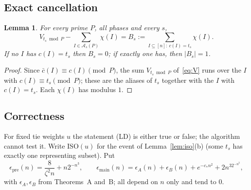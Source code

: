 \documentclass[11pt]{article}
\newtheorem{lemma}{Lemma}[section]
\theoremstyle{definition}
\newcommand{\bc}{\bar c}
\newcommand{\abs}[1]{\lvert #1\rvert}
\newcommand{\cA}{\mathcal A}
\begin{document}
\subsection{Exact cancellation}
\begin{lemma}\label{lem:cancel}
For every prime $P$, all phases and every $s$,
\begin{equation}\label{eq:cancel}
 V_{t_s\bmod P}-\sum_{I\in\cA_s(P)}\chi(I)=B_s:=\sum_{I\subseteq[n]:\ c(I)=t_s}\chi(I).
\end{equation}
If no $I$ has $c(I)=t_s$ then $B_s=0$; if exactly one has, then $\abs{B_s}=1$.
\end{lemma}
\begin{proof}
Since $\bc(I)\equiv c(I)\pmod P$, the sum $V_{t_s\bmod P}$ of~\eqref{eq:V} runs over the $I$ with
$c(I)\equiv t_s\pmod P$; these are the aliases of $t_s$ together with the $I$ with $c(I)=t_s$. Each $\chi(I)$ has
modulus $1$.
\end{proof}

\subsection{Correctness}
For fixed tie weights $u$ the statement \textup{(LD)} is either true or false; the algorithm cannot test it.
Write $\mathrm{ISO}(u)$ for the event of Lemma~\ref{lem:iso}(b) (some $t_s$ has exactly one representing subset).
Put
\[
 \epsilon_{\mathrm{pre}}(n)=\frac8{\zeta^2n}+n2^{-n^3},\qquad
 \epsilon_{\mathrm{main}}(n)=\epsilon_A(n)+\epsilon_B(n)+e^{-c_\ast n^2}+2n^32^{-n^3},
\]
with $\epsilon_A,\epsilon_B$ from Theorems~A and~B; all depend on $n$ only and tend to $0$.
\end{document}
